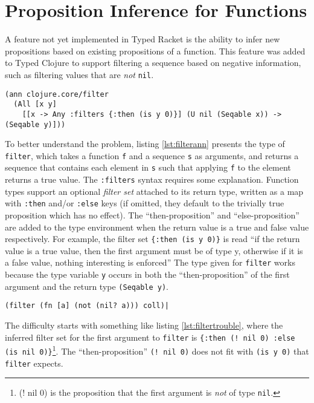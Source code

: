 \section{Proposition Inference for Functions}
\label{sec:filterneg}

A feature not yet implemented in Typed Racket is the ability
to infer new propositions based on existing propositions of a function.
This feature was added to Typed Clojure to support filtering
a sequence based on negative information, such as filtering values
that are \emph{not} \lstinline|nil|.

\begin{lstlisting}[caption=Type annotation for filter, label=lst:filterann]
(ann clojure.core/filter 
  (All [x y]
    [[x -> Any :filters {:then (is y 0)}] (U nil (Seqable x)) -> (Seqable y)]))
\end{lstlisting}

To better understand the problem, listing \ref{lst:filterann} presents the type of \lstinline|filter|,
which takes a function \lstinline|f| and a sequence \lstinline|s| as arguments, and returns a sequence that 
contains each element in \lstinline|s| such that applying \lstinline|f| to the element returns a true value.
The \lstinline|:filters| syntax requires some explanation. 
Function types support an optional \emph{filter set} attached to its return type, written as a map
with \lstinline|:then| and/or \lstinline|:else| keys (if omitted, they default to the trivially true proposition which has no effect). 
The ``then-proposition'' and ``else-proposition'' are added
to the type environment when the return value is a true and false value respectively.
For example, the filter set \lstinline|{:then (is y 0)}| is read ``if the return value is a true value, then the first argument
must be of type y, otherwise if it is a false value, nothing interesting is enforced''
The type given for \lstinline|filter| works because the type variable
\lstinline|y| occurs in both the ``then-proposition'' of the first argument and the return type 
\lstinline|(Seqable y)|.

\begin{lstlisting}[caption=Troublesome filter, label=lst:filtertrouble]
(filter (fn [a] (not (nil? a))) coll)|
\end{lstlisting}

The difficulty starts with something like listing \ref{lst:filtertrouble},
where the inferred filter set for the first argument to \lstinline|filter|
is \lstinline|{:then (! nil 0) :else (is nil 0)}|\footnote{(! nil 0) is the proposition that the first argument is \emph{not}
of type \lstinline|nil|.}. The ``then-proposition'' \lstinline|(! nil 0)| does not fit with
\lstinline|(is y 0)| that \lstinline|filter| expects.

